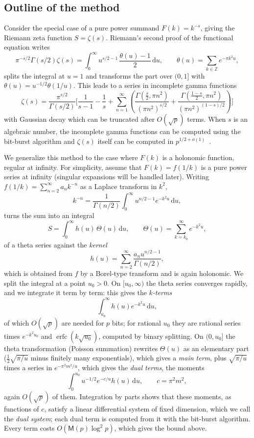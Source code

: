 \documentclass[11pt,reqno]{amsart}
\theoremstyle{definition}
\theoremstyle{remark}
\newcommand{\erfc}{\operatorname{erfc}}
\newcommand{\dd}{\,\mathrm{d}}
\newcommand{\ZZ}{\mathbb{Z}}
\newcommand{\Mul}{\mathsf{M}}
\begin{document}
\subsection{Outline of the method}\label{sec:method}

Consider the special case of a pure power summand $F(k) = k^{-s}$,
giving the Riemann zeta function $S = \zeta(s)$.
Riemann's second proof of the functional equation \cite{Rie59} writes
\[
  \pi^{-s/2}\Gamma(s/2)\zeta(s) = \int_0^\infty u^{s/2-1}\,\frac{\theta(u)-1}{2}\dd u, \qquad
  \theta(u) = \sum_{k\in\ZZ} e^{-\pi k^2 u},
\]
splits the integral at $u = 1$ and transforms the part over $(0, 1]$
with $\theta(u) = u^{-1/2}\theta(1/u)$. This leads to a series in incomplete gamma functions
\[
\zeta(s)
= \frac{\pi^{s/2}}{\Gamma(s/2)}
\bigg[
\frac{1}{s-1}-\frac{1}{s}
+\sum_{n=1}^{\infty}
\left(
\frac{\Gamma\left(\frac{s}{2},\pi n^2\right)}
     {(\pi n^2)^{s/2}}
+
\frac{\Gamma\left(\frac{1-s}{2},\pi n^2\right)}
     {(\pi n^2)^{(1-s)/2}}
\right)
\bigg]
\]
with Gaussian decay which can be truncated after $O(\sqrt{p})$ terms.
When $s$ is an algebraic number, the incomplete gamma functions
can be computed using the bit-burst algorithm and $\zeta(s)$ itself
can be computed in $p^{1/2+o(1)}$~\cite{Joh21}.

We generalize this method to the case where $F(k)$ is a holonomic function, regular at infinity.
For simplicity, assume that $F(k) = f(1/k)$ is a pure power series at infinity (singular expansions will be handled later).
Writing $f(1/k) = \sum_{n=2}^{\infty} a_nk^{-n}$ as a Laplace transform in $k^2$,
\[
  k^{-n} = \frac{1}{\Gamma(n/2)}\int_0^\infty u^{n/2-1}e^{-k^2u}\dd u,
\]
turns the sum into an integral
\[
  S = \int_0^\infty h(u)\,\Theta(u)\dd u, \qquad \Theta(u) = \sum_{k=k_0}^{\infty}e^{-k^2u},
\]
of a theta series against the \emph{kernel}
\[
  h(u) = \sum_{n=2}^{\infty} \frac{a_n u^{n/2-1}}{\Gamma(n/2)},
\]
which is obtained from $f$ by a Borel-type transform and is again holonomic. We split the integral at a point
$u_0 > 0$. On $[u_0, \infty)$ the theta series converges rapidly, and we integrate it term by term: this gives the
\emph{$k$-terms}
\[
  \int_{u_0}^\infty h(u)e^{-k^2u}\dd u,
\]
of which $O(\sqrt p)$ are needed for $p$ bits; for rational $u_0$ they are rational series times $e^{-k^2u_0}$ and
$\erfc(k\sqrt{u_0})$, computed by binary splitting. On $(0, u_0]$ the theta transformation (Poisson summation)
rewrites $\Theta(u)$ as an elementary part ($\frac12\sqrt{\pi/u}$ minus finitely many exponentials), which gives a
\emph{main term}, plus $\sqrt{\pi/u}$ times a series in $e^{-\pi^2m^2/u}$, which gives the \emph{dual terms}, the
moments
\[
  \int_0^{u_0}u^{-1/2}e^{-c/u}h(u)\dd u, \qquad c = \pi^2m^2,
\]
again $O(\sqrt p)$ of them. Integration by parts shows that these moments, as functions of $c$,
satisfy a linear differential system of fixed dimension, which we call the \emph{dual system}; each dual term is
computed from it with the bit-burst algorithm. Every term costs $O(\Mul(p)\log^2 p)$, which gives the bound above.
\end{document}
